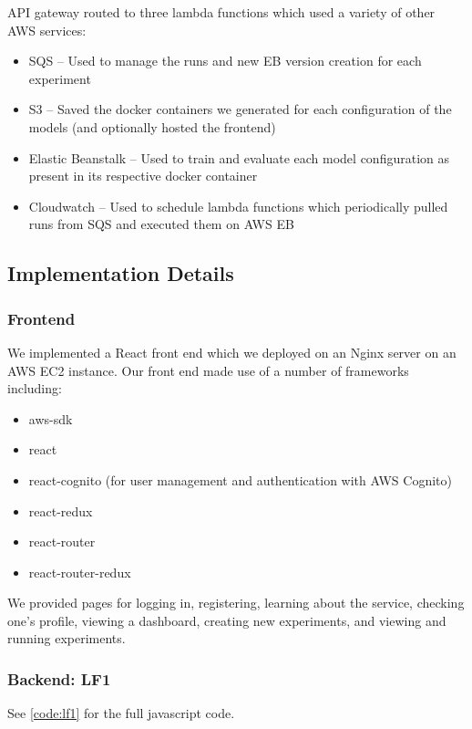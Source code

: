 \documentclass[12pt,oneside]{amsart}
\begin{document}
\begin{multicols}{2}
API gateway routed to three lambda functions which used a variety of other AWS services:

\begin{itemize}
  \item SQS -- Used to manage the runs and new EB version creation for each experiment
  \item S3 -- Saved the docker containers we generated for each configuration of the models (and optionally hosted the frontend)
  \item Elastic Beanstalk -- Used to train and evaluate each model configuration as present in its respective docker container
  \item Cloudwatch -- Used to schedule lambda functions which periodically pulled runs from SQS and executed them on AWS EB
\end{itemize}

\subsection{Implementation Details} \label{ch:solidity_work}

\end{multicols}
\subsubsection{Frontend}
We implemented a React front end which we deployed on an Nginx server on an AWS EC2 instance.
Our front end made use of a number of frameworks including:

\begin{itemize}
  \item aws-sdk
  \item react
  \item react-cognito (for user management and authentication with AWS Cognito)
  \item react-redux
  \item react-router
  \item react-router-redux
\end{itemize}

We provided pages for logging in, registering, learning about the service, checking one's profile, viewing a dashboard, creating new experiments, and viewing and running experiments.

\subsubsection{Backend: LF1}
See \ref{code:lf1} for the full javascript code.
\end{document}
